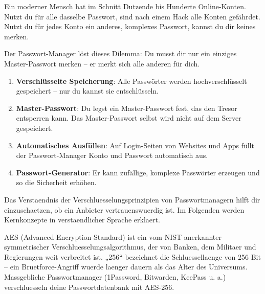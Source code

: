 


Ein moderner Mensch hat im Schnitt Dutzende bis Hunderte Online-Konten. Nutzt du für alle dasselbe Passwort, sind nach einem Hack alle Konten gefährdet. Nutzt du für jedes Konto ein anderes, komplexes Passwort, kannst du dir keines merken.

Der Passwort-Manager löst dieses Dilemma: Du musst dir nur ein einziges Master-Passwort merken – er merkt sich alle anderen für dich.


\begin{enumerate}
  \item \textbf{Verschlüsselte Speicherung}: Alle Passwörter werden hochverschlüsselt gespeichert – nur du kannst sie entschlüsseln.
  \item \textbf{Master-Passwort}: Du legst ein Master-Passwort fest, das den Tresor entsperren kann. Das Master-Passwort selbst wird nicht auf dem Server gespeichert.
  \item \textbf{Automatisches Ausfüllen}: Auf Login-Seiten von Websites und Apps füllt der Passwort-Manager Konto und Passwort automatisch aus.
  \item \textbf{Passwort-Generator}: Er kann zufällige, komplexe Passwörter erzeugen und so die Sicherheit erhöhen.
\end{enumerate}


Das Verstaendnis der Verschluesselungsprinzipien von Passwortmanagern hilft dir einzuschaetzen, ob ein Anbieter vertrauenswuerdig ist. Im Folgenden werden Kernkonzepte in verstaendlicher Sprache erklaert.


AES (Advanced Encryption Standard) ist ein vom NIST anerkannter symmetrischer Verschluesselungsalgorithmus, der von Banken, dem Militaer und Regierungen weit verbreitet ist. „256“ bezeichnet die Schluessellaenge von 256 Bit – ein Bruetforce-Angriff wuerde laenger dauern als das Alter des Universums. Massgebliche Passwortmanager (1Password, Bitwarden, KeePass u. a.) verschluesseln deine Passwortdatenbank mit AES-256.

